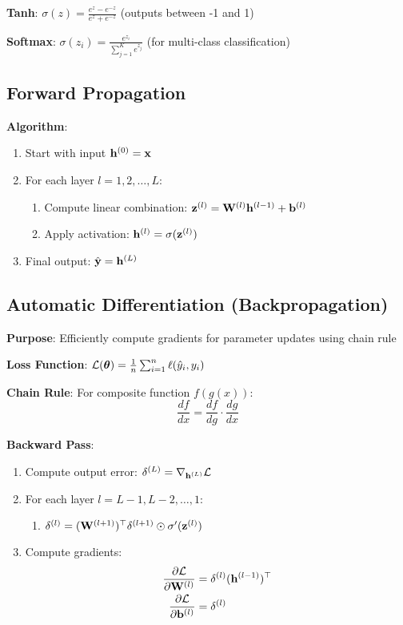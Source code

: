 \documentclass{article}
\begin{document}
\textbf{Tanh}: $\sigma(z) = \frac{e^z - e^{-z}}{e^z + e^{-z}}$ (outputs between -1 and 1)

\textbf{Softmax}: $\sigma(z_i) = \frac{e^{z_i}}{\sum_{j=1}^K e^{z_j}}$ (for multi-class classification)

\subsection{Forward Propagation}

\textbf{Algorithm}:
\begin{enumerate}
    \item Start with input $\mathbf{h}^{(0)} = \mathbf{x}$
    \item For each layer $l = 1, 2, \ldots, L$:
    \begin{enumerate}
        \item Compute linear combination: $\mathbf{z}^{(l)} = \mathbf{W}^{(l)}\mathbf{h}^{(l-1)} + \mathbf{b}^{(l)}$
        \item Apply activation: $\mathbf{h}^{(l)} = \sigma(\mathbf{z}^{(l)})$
    \end{enumerate}
    \item Final output: $\hat{\mathbf{y}} = \mathbf{h}^{(L)}$
\end{enumerate}

\subsection{Automatic Differentiation (Backpropagation)}

\textbf{Purpose}: Efficiently compute gradients for parameter updates using chain rule

\textbf{Loss Function}: $\mathcal{L}(\boldsymbol{\theta}) = \frac{1}{n}\sum_{i=1}^n \ell(\hat{y}_i, y_i)$

\textbf{Chain Rule}: For composite function $f(g(x))$:
$$\frac{df}{dx} = \frac{df}{dg} \cdot \frac{dg}{dx}$$

\textbf{Backward Pass}:
\begin{enumerate}
    \item Compute output error: $\delta^{(L)} = \nabla_{\mathbf{h}^{(L)}} \mathcal{L}$
    \item For each layer $l = L-1, L-2, \ldots, 1$:
    \begin{enumerate}
        \item $\delta^{(l)} = (\mathbf{W}^{(l+1)})^\top \delta^{(l+1)} \odot \sigma'(\mathbf{z}^{(l)})$
    \end{enumerate}
    \item Compute gradients:
    \begin{align}
        \frac{\partial \mathcal{L}}{\partial \mathbf{W}^{(l)}} &= \delta^{(l)} (\mathbf{h}^{(l-1)})^\top \\
        \frac{\partial \mathcal{L}}{\partial \mathbf{b}^{(l)}} &= \delta^{(l)}
    \end{align}
\end{enumerate}
\end{document}
